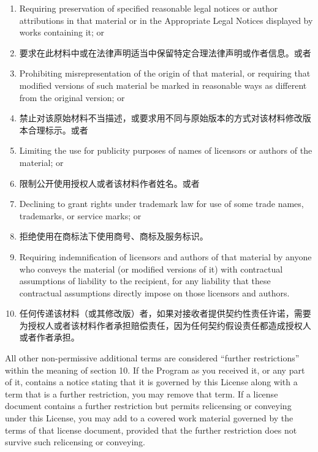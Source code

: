 \documentclass[11pt]{article}
\begin{document}
\begin{enumerate}
\begin{enumerate}
          \item Requiring preservation of specified reasonable legal notices or
                author attributions in that material or in the Appropriate Legal
                Notices displayed by works containing it; or

          \item 要求在此材料中或在法律声明适当中保留特定合理法律声明或作者信息。或者

          \item Prohibiting misrepresentation of the origin of that material, or
                requiring that modified versions of such material be marked in
                reasonable ways as different from the original version; or

          \item 禁止对该原始材料不当描述，或要求用不同与原始版本的方式对该材料修改版本合理标示。或者

          \item Limiting the use for publicity purposes of names of licensors or
                authors of the material; or

          \item 限制公开使用授权人或者该材料作者姓名。或者

          \item Declining to grant rights under trademark law for use of some
                trade names, trademarks, or service marks; or

          \item 拒绝使用在商标法下使用商号、商标及服务标识。

          \item Requiring indemnification of licensors and authors of that
                material by anyone who conveys the material (or modified versions of
                it) with contractual assumptions of liability to the recipient, for
                any liability that these contractual assumptions directly impose on
                those licensors and authors.
          \item 任何传递该材料（或其修改版）者，如果对接收者提供契约性责任许诺，需要为授权人或者该材料作者承担赔偿责任，因为任何契约假设责任都造成授权人或者作者承担。

        \end{enumerate}

        All other non-permissive additional terms are considered ``further
        restrictions'' within the meaning of section 10.  If the Program as you
        received it, or any part of it, contains a notice stating that it is
        governed by this License along with a term that is a further
        restriction, you may remove that term.  If a license document contains
        a further restriction but permits relicensing or conveying under this
        License, you may add to a covered work material governed by the terms
        of that license document, provided that the further restriction does
        not survive such relicensing or conveying.


\end{enumerate}
\end{document}
